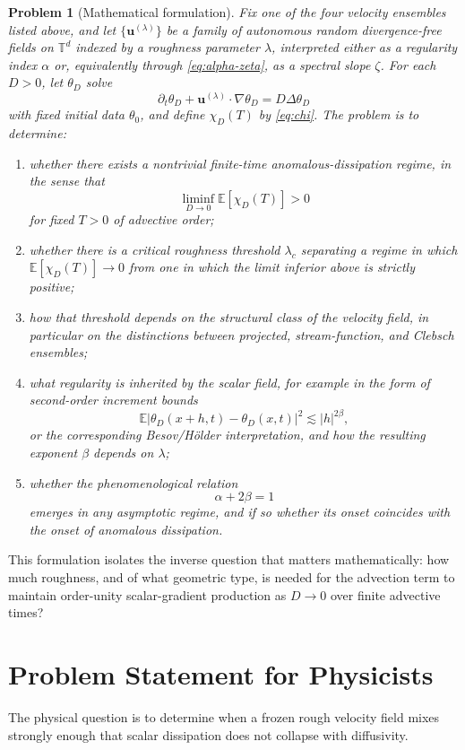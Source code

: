 \documentclass[11pt]{article}
\newtheorem{problem}{Problem}
\newcommand{\E}{\mathbb{E}}
\newcommand{\T}{\mathbb{T}}
\newcommand{\uu}{\mathbf{u}}
\begin{document}
\begin{problem}[Mathematical formulation]
Fix one of the four velocity ensembles listed above, and let $\{\uu^{(\lambda)}\}$ be a family of autonomous random divergence-free fields on $\T^d$ indexed by a roughness parameter $\lambda$, interpreted either as a regularity index $\alpha$ or, equivalently through \eqref{eq:alpha-zeta}, as a spectral slope $\zeta$. For each $D>0$, let $\theta_D$ solve
\[
\partial_t \theta_D + \uu^{(\lambda)}\cdot \nabla \theta_D = D\Delta \theta_D
\]
with fixed initial data $\theta_0$, and define $\chi_D(T)$ by \eqref{eq:chi}. The problem is to determine:
\begin{enumerate}
\item whether there exists a nontrivial finite-time anomalous-dissipation regime, in the sense that
\[
\liminf_{D\to 0}\E[\chi_D(T)] > 0
\]
for fixed $T>0$ of advective order;
\item whether there is a critical roughness threshold $\lambda_c$ separating a regime in which $\E[\chi_D(T)]\to 0$ from one in which the limit inferior above is strictly positive;
\item how that threshold depends on the structural class of the velocity field, in particular on the distinctions between projected, stream-function, and Clebsch ensembles;
\item what regularity is inherited by the scalar field, for example in the form of second-order increment bounds
\[
\E|\theta_D(x+h,t)-\theta_D(x,t)|^2 \lesssim |h|^{2\beta},
\]
or the corresponding Besov/H\"older interpretation, and how the resulting exponent $\beta$ depends on $\lambda$;
\item whether the phenomenological relation
\[
\alpha + 2\beta = 1
\]
emerges in any asymptotic regime, and if so whether its onset coincides with the onset of anomalous dissipation.
\end{enumerate}
\end{problem}

This formulation isolates the inverse question that matters mathematically: how much roughness, and of what geometric type, is needed for the advection term to maintain order-unity scalar-gradient production as $D\to 0$ over finite advective times?

\section{Problem Statement for Physicists}
The physical question is to determine when a frozen rough velocity field mixes strongly enough that scalar dissipation does not collapse with diffusivity.
\end{document}
